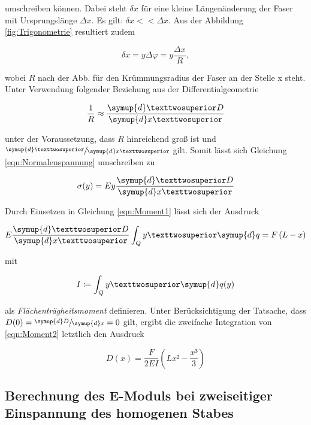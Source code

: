 \noindent umschreiben können. Dabei steht $\delta x$ für eine kleine Längenänderung der Faser mit Ursprungslänge $\Delta x$. Es gilt:
$\delta x << \Delta x$. Aus der Abbildung \ref{fig:Trigonometrie} resultiert zudem 

\begin{equation*}
    \delta x = y\Delta\varphi = y\frac{\Delta x}{R},
\end{equation*}

\noindent wobei $R$ nach der Abb. für den Krümmungsradius der Faser an der Stelle x steht. Unter Verwendung folgender Beziehung aus der 
Differentialgeometrie

\begin{equation*}
    \frac{1}{R} \approx \frac{\symup{d}²D}{\symup{d}x²}
\end{equation*}

\noindent unter der Voraussetzung, dass $R$ hinreichend groß ist und $\sfrac{\symup{d}²}{\symup{d}x²}$ gilt. Somit lässt sich
Gleichung \eqref{eqn:Normalenspannung} umschreiben zu

\begin{equation*}
    \sigma(y) = Ey\frac{\symup{d}²D}{\symup{d}x²}
\end{equation*}

\noindent Durch Einsetzen in Gleichung \eqref{eqn:Moment1} lässt sich der Ausdruck

\begin{equation}
\label{eqn:Moment2}
    E\frac{\symup{d}²D}{\symup{d}x²}\int_Q y²\symup{d}q = F\left(L-x\right)
\end{equation}

\noindent mit

\begin{equation*}
    I \coloneqq \int_Q y²\symup{d}q(y)
\end{equation*}

\noindent als \emph{Flächenträgheitsmoment} definieren. Unter Berücksichtigung der Tatsache, dass $D(0) = \sfrac{\symup{d}D}{\symup{d}x} = 0$ gilt, ergibt die zweifache Integration
von \eqref{eqn:Moment2} letztlich den Ausdruck

\begin{equation}
    D(x) = \frac{F}{2EI}\left(Lx²-\frac{x³}{3}\right)
\end{equation}

\subsection{Berechnung des E-Moduls bei zweiseitiger Einspannung des homogenen Stabes}

